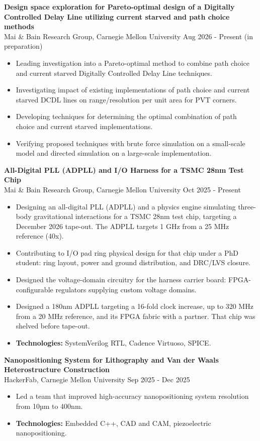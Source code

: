 \documentclass[10pt,letterpaper]{article}
\newcommand{\tightlist}{%
  \setlength{\itemsep}{0pt}%
  \setlength{\leftmargin}{1.0em}%
  \setlength{\parskip}{0pt}%
  \setlength{\topsep}{1.5pt}%
  \setlength{\parsep}{0pt}%
}
\newlength{\cvkeepskip}
\newcommand{\cvkeep}[1]{%
  \begingroup
    \setlength{\cvkeepskip}{#1}%
    \ifdim\pagegoal<\maxdimen
      \addtolength{\cvkeepskip}{\pagetotal}%
      \ifdim\cvkeepskip>\pagegoal
        \newpage
      \fi
    \fi
  \endgroup
}
\newcommand{\entrysep}{\vspace{2pt}\cvkeep{140pt}}
\newcommand{\cvwhen}[1]{\textsf{#1}}%
\begin{document}
\textbf{Design space exploration for Pareto-optimal design of a Digitally
Controlled Delay Line utilizing current starved and path choice methods} \\
Mai \& Bain Research Group, Carnegie Mellon University \hfill
\cvwhen{Aug 2026 - Present (in preparation)}
\begin{itemize}\tightlist
  \item Leading investigation into a Pareto-optimal method to combine path
    choice and current starved Digitally Controlled Delay Line techniques.
  \item Investigating impact of existing implementations of path choice and
    current starved DCDL lines on range/resolution per unit area for PVT
    corners.
  \item Developing techniques for determining the optimal combination of path
    choice and current starved implementations.
  \item Verifying proposed techniques with brute force simulation on a
    small-scale model and directed simulation on a large-scale implementation.
\end{itemize}

\entrysep
\textbf{All-Digital PLL (ADPLL) and I/O Harness for a TSMC 28nm Test Chip} \\
Mai \& Bain Research Group, Carnegie Mellon University \hfill
\cvwhen{Oct 2025 - Present}
\begin{itemize}\tightlist
  \item Designing an all-digital PLL (ADPLL) and a physics engine simulating
    three-body gravitational interactions for a TSMC 28nm test chip, targeting a
    December 2026 tape-out. The ADPLL targets 1 GHz from a 25 MHz reference (40x).
  \item Contributing to I/O pad ring physical design for that chip under a PhD
    student: ring layout, power and ground distribution, and DRC/LVS closure.
  \item Designed the voltage-domain circuitry for the harness carrier board:
    FPGA-configurable regulators supplying custom voltage domains.
  \item Designed a 180nm ADPLL targeting a 16-fold clock increase, up to
    320 MHz from a 20 MHz reference, and its FPGA fabric with a partner. That
    chip was shelved before tape-out.
  \item \textbf{Technologies:} SystemVerilog RTL, Cadence Virtuoso, SPICE.
\end{itemize}

\entrysep
\textbf{Nanopositioning System for Lithography and Van der Waals
Heterostructure Construction} \\
HackerFab, Carnegie Mellon University \hfill \cvwhen{Sep 2025 - Dec 2025}
\begin{itemize}\tightlist
  \item Led a team that improved high-accuracy nanopositioning system resolution
    from 10µm to 400nm.
  \item \textbf{Technologies:} Embedded C++, CAD and CAM, piezoelectric
    nanopositioning.
\end{itemize}
\end{document}
